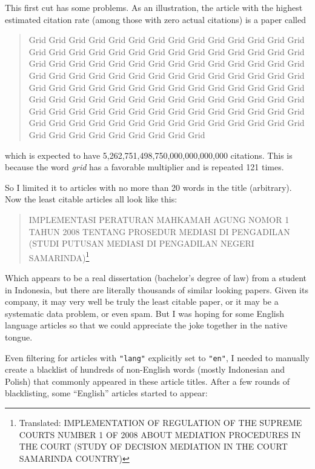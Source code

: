 \documentclass[twocolumn]{article}
\begin{document}
This first cut has some problems. As an illustration, the article
with the highest estimated citation rate (among those with zero actual
citations) is a paper\cite{leigland2009grid} called
\begin{quote}
Grid Grid Grid Grid Grid Grid Grid Grid Grid Grid Grid Grid Grid Grid Grid Grid Grid Grid Grid Grid Grid Grid Grid Grid Grid Grid Grid Grid Grid Grid Grid Grid Grid Grid Grid Grid Grid Grid Grid Grid Grid Grid Grid Grid Grid Grid Grid Grid Grid Grid Grid Grid Grid Grid Grid Grid Grid Grid Grid Grid Grid Grid Grid Grid Grid Grid Grid Grid Grid Grid Grid Grid Grid Grid Grid Grid Grid Grid Grid Grid Grid Grid Grid Grid Grid Grid Grid Grid Grid Grid Grid Grid Grid Grid Grid Grid Grid Grid Grid Grid Grid Grid Grid Grid Grid Grid Grid Grid Grid Grid Grid Grid Grid Grid Grid Grid Grid Grid Grid Grid Grid
\end{quote}
which is expected to have 5,262,751,498,750,000,000,000,000 citations.
This is because the word {\em grid} has a favorable multiplier and is
repeated 121 times. 

So I limited it to articles with no more than 20 words in the title
(arbitrary). Now the least citable articles all look like this:

\begin{quote}
  IMPLEMENTASI PERATURAN MAHKAMAH AGUNG NOMOR 1 TAHUN 2008 TENTANG
  PROSEDUR MEDIASI DI PENGADILAN (STUDI PUTUSAN MEDIASI DI PENGADILAN
  NEGERI SAMARINDA)\footnote{Translated: IMPLEMENTATION OF REGULATION
    OF THE SUPREME COURTS NUMBER 1 OF 2008 ABOUT MEDIATION
    PROCEDURES IN THE COURT (STUDY OF DECISION MEDIATION IN THE COURT
    SAMARINDA COUNTRY)}
\end{quote}

Which appears to be a real dissertation\cite{putri2009implementasi}
(bachelor's degree of law) from a student in Indonesia, but there are
literally thousands of similar looking papers. Given its company, it
may very well be truly the least citable paper, or it may be a systematic
data problem, or even spam. But I was hoping for some English language
articles so that we could appreciate the joke together in the native
tongue. 

Even filtering for articles with \verb+"lang"+ explicitly set to
\verb+"en"+, I needed to manually create a blacklist of hundreds of
non-English words (mostly Indonesian and Polish) that commonly
appeared in these article titles. After a few rounds of blacklisting,
some ``English'' articles started to appear:
\end{document}
